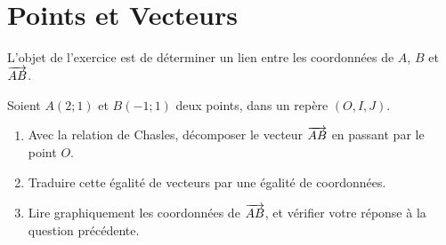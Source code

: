 \documentclass[12pt,169]{beamer}
\begin{document}
\section{Points et Vecteurs}
\begin{frame}
  \begin{center}
\end{center}

L'objet de l'exercice est de déterminer un lien entre les coordonnées de $A$, $B$ et $\overrightarrow{AB}$.

Soient $A\left( 2;1 \right)$ et $B\left( -1;1 \right)$ deux points, dans un repère $\left( O, I, J \right)$.
\begin{enumerate}
  \item Avec la relation de Chasles, décomposer le vecteur $\overrightarrow{AB}$ en passant par le point $O$.
  \item Traduire cette égalité de vecteurs par une égalité de coordonnées.
  \item Lire graphiquement les coordonnées de $\overrightarrow{AB}$, et vérifier votre réponse à la question précédente.
\end{enumerate}
\end{frame}
\end{document}
